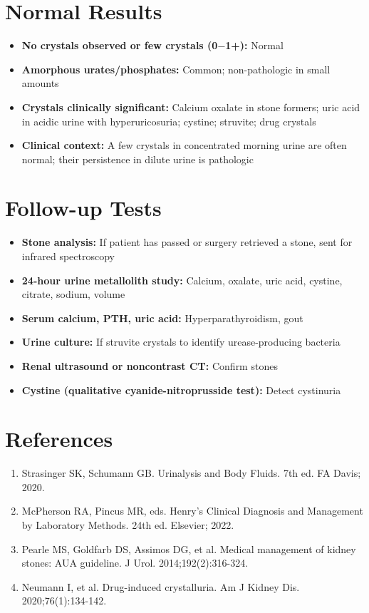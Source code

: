 \section*{Normal Results}
\begin{itemize}
  \item \textbf{No crystals observed or few crystals (0$-$1+):} Normal
  \item \textbf{Amorphous urates/phosphates:} Common; non-pathologic in small amounts
  \item \textbf{Crystals clinically significant:} Calcium oxalate in stone formers; uric acid in acidic urine with hyperuricosuria; cystine; struvite; drug crystals
  \item \textbf{Clinical context:} A few crystals in concentrated morning urine are often normal; their persistence in dilute urine is pathologic
\end{itemize}

\section*{Follow-up Tests}
\begin{itemize}
  \item \textbf{Stone analysis:} If patient has passed or surgery retrieved a stone, sent for infrared spectroscopy
  \item \textbf{24-hour urine metallolith study:} Calcium, oxalate, uric acid, cystine, citrate, sodium, volume
  \item \textbf{Serum calcium, PTH, uric acid:} Hyperparathyroidism, gout
  \item \textbf{Urine culture:} If struvite crystals to identify urease-producing bacteria
  \item \textbf{Renal ultrasound or noncontrast CT:} Confirm stones
  \item \textbf{Cystine (qualitative cyanide-nitroprusside test):} Detect cystinuria
\end{itemize}

\section*{References}
\begin{enumerate}
  \item Strasinger SK, Schumann GB. Urinalysis and Body Fluids. 7th ed. FA Davis; 2020.
  \item McPherson RA, Pincus MR, eds. Henry's Clinical Diagnosis and Management by Laboratory Methods. 24th ed. Elsevier; 2022.
  \item Pearle MS, Goldfarb DS, Assimos DG, et al. Medical management of kidney stones: AUA guideline. J Urol. 2014;192(2):316-324.
  \item Neumann I, et al. Drug-induced crystalluria. Am J Kidney Dis. 2020;76(1):134-142.
\end{enumerate}

\clearpage